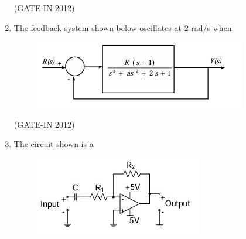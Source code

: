 \documentclass[journal,12pt,onecolumn]{IEEEtran}
\theoremstyle{remark}
\begin{document}
\begin{enumerate}
\hfill{(GATE-IN 2012)}
\begin{enumerate}
\end{enumerate}

\item The feedback system shown below oscillates at $2$ rad/s when
\begin{figure}[H]
    \centering
    \includegraphics[width=0.8\columnwidth]{figs/a19.jpg}
    \caption*{}
    \label{fig:a19}
\end{figure}

\hfill{(GATE-IN 2012)}
\begin{enumerate}
\end{enumerate}

\item The circuit shown is a
\begin{figure}[H]
    \centering
    \includegraphics[width=0.6\columnwidth]{figs/a20.jpg}
    \caption*{}
    \label{fig:a20}
\end{figure}


\end{enumerate}
\end{document}
